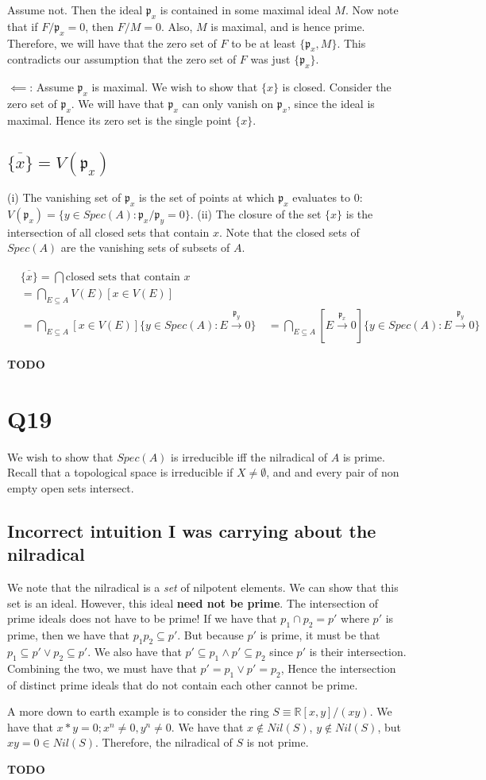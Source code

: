 \documentclass{book}
\newcommand{\frakp}{\ensuremath{\mathfrak{p}}}
\theoremstyle{definition}
\begin{document}
Assume not. Then the ideal $\frakp_x$ is contained in some maximal ideal $M$.
Now note that if $F / \frakp_x = 0$, then $F / M = 0$. Also, $M$ is maximal, and
is hence prime. Therefore, we will have that the zero set of $F$ to be
at least $\{ \frakp_x, M \}$. This contradicts our assumption that the
zero set of $F$ was just $\{ \frakp_x \}$.

$\impliedby$: Assume $\frakp_x$ is maximal. We wish to show that $\{ x \}$ is
closed.  Consider the zero set of $\frakp_x$. We will have that $\frakp_x$ can
only vanish on $\frakp_x$, since the ideal is maximal. Hence its zero set is
the single point $\{ x \}$.

\subsection{$\overline{\{ x \}} = V(\frakp_x)$}
(i) The vanishing set of $\frakp_x$ is the set of points at which
$\frakp_x$ evaluates to $0$: $V(\frakp_x) = \{ y \in Spec(A) : \frakp_x / \frakp_y = 0 \}$.
(ii) The closure of the set $\{x \}$ is the intersection of all closed sets that contain $x$.
Note that the closed sets of $Spec(A)$ are the vanishing sets of subsets of $A$.

\begin{align*}
    &\overline{\{ x \}} = \bigcap \text{closed sets that contain $x$} \\
    &= \bigcap_{E \subseteq A} V(E) [x \in V(E)] \\
    &=  \bigcap_{E\subseteq A} [x \in V(E)]  \{ y \in Spec(A): E \xrightarrow{\frakp_y} 0 \} \
    &=  \bigcap_{E\subseteq A} [E \xrightarrow{\frakp_x}  0]  \{ y \in Spec(A): E \xrightarrow{\frakp_y} 0 \}
\end{align*}

\textbf{TODO}

\section{Q19}
We wish to show that $Spec(A)$ is irreducible iff the nilradical of $A$ is prime.
Recall that a topological space is irreducible if $X \neq \emptyset$, and
and every pair of non empty open sets intersect.

\subsection{Incorrect intuition I was carrying about the nilradical}
We note that the nilradical is a \emph{set} of nilpotent elements. We can show
that this set is an ideal. However, this ideal \textbf{need not be prime}.
The intersection of prime ideals
does not have to be prime! If we have that $p_1 \cap p_2 = p'$ where $p'$ is
prime, then we have that $p_1 p_2 \subseteq p'$. But because $p'$ is prime,
it must be that $p_1 \subseteq p' \lor p_2 \subseteq p'$. We also
have that $p' \subseteq p_1 \land p' \subseteq p_2$ since $p'$ is their intersection.
Combining the two, we must have that $p' = p_1 \lor p' = p_2$, 
Hence the intersection of distinct prime ideals that do not contain each other
cannot be prime.

A more down to earth example is to consider the ring $S \equiv \mathbb R[x, y] / (xy)$.
We have that $x * y = 0; x^n \neq 0, y^n \neq 0$. We have that $x \not \in Nil(S)$,
$y \not \in Nil(S)$, but $xy = 0 \in Nil(S)$. Therefore, the nilradical of $S$
is not prime.

\textbf{TODO}
\end{document}
